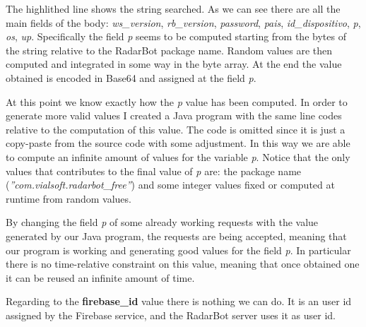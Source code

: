 			\par The highlithed line shows the string searched. As we can see there are all the main fields of the body: \textit{ws\_version}, \textit{rb\_version}, \textit{password}, \textit{pais}, \textit{id\_dispositivo}, \textit{p}, \textit{os}, \textit{up}. Specifically the field \textit{p} seems to be computed starting from the bytes of the string relative to the RadarBot package name. Random values are then computed and integrated in some way in the byte array. At the end the value obtained is encoded in Base64 and assigned at the field \textit{p}.\newline
			\par At this point we know exactly how the \textit{p} value has been computed. In order to generate more valid values I created a Java program with the same line codes relative to the computation of this value. The code is omitted since it is just a copy-paste from the source code with some adjustment. In this way we are able to compute an infinite amount of values for the variable \textit{p}.   \newline
			Notice that the only values that contributes to the final value of \textit{p} are: the package name (\textit{''com.vialsoft.radarbot\_free''}) and some integer values fixed or computed at runtime from random values. \newline
			\par By changing the field \textit{p} of some already working requests with the value generated by our Java program, the requests are being accepted, meaning that our program is working and generating good values for the field \textit{p}. In particular there is no time-relative constraint on this value, meaning that once obtained one it can be reused an infinite amount of time. \newline
			\par Regarding to the \textbf{firebase\_id} value there is nothing we can do. It is an user id assigned by the Firebase service, and the RadarBot server uses it as user id. 
			
